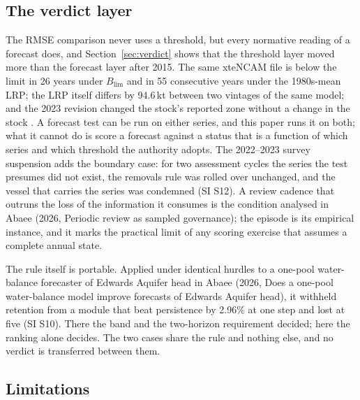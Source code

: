 \documentclass[preprint,11pt,authoryear]{elsarticle}
\theoremstyle{definition}
\theoremstyle{remark}
\newcommand{\Blim}{B_{\mathrm{lim}}}
\begin{document}
\subsection{The verdict layer}\label{sec:verdictlayer}

The RMSE comparison never uses a threshold, but every normative reading of a forecast does, and Section~\ref{sec:verdict} shows that the threshold layer moved more than the forecast layer after 2015. The same xteNCAM file is below the limit in 26 years under $\Blim$ and in 55 consecutive years under the 1980s-mean LRP; the LRP itself differs by 94.6\,kt between two vintages of the same model; and the 2023 revision changed the stock's reported zone without a change in the stock \citep{DFO2024a,Regular2025}. A forecast test can be run on either series, and this paper runs it on both; what it cannot do is score a forecast against a status that is a function of which series and which threshold the authority adopts. The 2022--2023 survey suspension adds the boundary case: for two assessment cycles the series the test presumes did not exist, the removals rule was rolled over unchanged, and the vessel that carries the series was condemned (SI S12). A review cadence that outruns the loss of the information it consumes is the condition analysed in Abaee (2026, Periodic review as sampled governance); the episode is its empirical instance, and it marks the practical limit of any scoring exercise that assumes a complete annual state.

The rule itself is portable. Applied under identical hurdles to a one-pool water-balance forecaster of Edwards Aquifer head in Abaee (2026, Does a one-pool water-balance model improve forecasts of Edwards Aquifer head), it withheld retention from a module that beat persistence by 2.96\% at one step and lost at five (SI S10). There the band and the two-horizon requirement decided; here the ranking alone decides. The two cases share the rule and nothing else, and no verdict is transferred between them.

\subsection{Limitations}\label{sec:limits}
\end{document}
